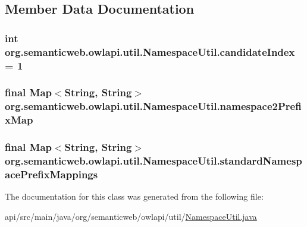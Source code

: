 \subsection{Member Data Documentation}
\hypertarget{classorg_1_1semanticweb_1_1owlapi_1_1util_1_1_namespace_util_afcd9487996c3a57df94d137c19e2eccb}{
\subsubsection[{candidate\-Index}]{\setlength{\rightskip}{0pt plus 5cm}int org.\-semanticweb.\-owlapi.\-util.\-Namespace\-Util.\-candidate\-Index = 1\hspace{0.3cm}{\ttfamily [private]}}}\label{classorg_1_1semanticweb_1_1owlapi_1_1util_1_1_namespace_util_afcd9487996c3a57df94d137c19e2eccb}
\hypertarget{classorg_1_1semanticweb_1_1owlapi_1_1util_1_1_namespace_util_ab77f61f40947ed5565ac456f6aafdf19}{
\subsubsection[{namespace2\-Prefix\-Map}]{\setlength{\rightskip}{0pt plus 5cm}final Map$<$String, String$>$ org.\-semanticweb.\-owlapi.\-util.\-Namespace\-Util.\-namespace2\-Prefix\-Map\hspace{0.3cm}{\ttfamily [private]}}}\label{classorg_1_1semanticweb_1_1owlapi_1_1util_1_1_namespace_util_ab77f61f40947ed5565ac456f6aafdf19}
\hypertarget{classorg_1_1semanticweb_1_1owlapi_1_1util_1_1_namespace_util_a39d88998b2313c7a95f266b66040da8f}{
\subsubsection[{standard\-Namespace\-Prefix\-Mappings}]{\setlength{\rightskip}{0pt plus 5cm}final Map$<$String, String$>$ org.\-semanticweb.\-owlapi.\-util.\-Namespace\-Util.\-standard\-Namespace\-Prefix\-Mappings\hspace{0.3cm}{\ttfamily [private]}}}\label{classorg_1_1semanticweb_1_1owlapi_1_1util_1_1_namespace_util_a39d88998b2313c7a95f266b66040da8f}


The documentation for this class was generated from the following file\-:\begin{DoxyCompactItemize}
\item 
api/src/main/java/org/semanticweb/owlapi/util/\hyperlink{_namespace_util_8java}{Namespace\-Util.\-java}\end{DoxyCompactItemize}
